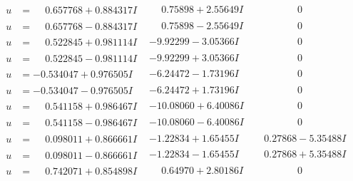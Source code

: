 \documentclass[1p]{elsarticle_modified}
\theoremstyle{definition}
\begin{document}
$$\begin{array}{c|c|c}
\begin{aligned}
u &= \phantom{-}0.657768 + 0.884317 I\end{aligned}
 & \phantom{-}0.75898 + 2.55649 I & \phantom{-0.000000 } 0 \\ \hline\begin{aligned}
u &= \phantom{-}0.657768 - 0.884317 I\end{aligned}
 & \phantom{-}0.75898 - 2.55649 I & \phantom{-0.000000 } 0 \\ \hline\begin{aligned}
u &= \phantom{-}0.522845 + 0.981114 I\end{aligned}
 & -9.92299 - 3.05366 I & \phantom{-0.000000 } 0 \\ \hline\begin{aligned}
u &= \phantom{-}0.522845 - 0.981114 I\end{aligned}
 & -9.92299 + 3.05366 I & \phantom{-0.000000 } 0 \\ \hline\begin{aligned}
u &= -0.534047 + 0.976505 I\end{aligned}
 & -6.24472 - 1.73196 I & \phantom{-0.000000 } 0 \\ \hline\begin{aligned}
u &= -0.534047 - 0.976505 I\end{aligned}
 & -6.24472 + 1.73196 I & \phantom{-0.000000 } 0 \\ \hline\begin{aligned}
u &= \phantom{-}0.541158 + 0.986467 I\end{aligned}
 & -10.08060 + 6.40086 I & \phantom{-0.000000 } 0 \\ \hline\begin{aligned}
u &= \phantom{-}0.541158 - 0.986467 I\end{aligned}
 & -10.08060 - 6.40086 I & \phantom{-0.000000 } 0 \\ \hline\begin{aligned}
u &= \phantom{-}0.098011 + 0.866661 I\end{aligned}
 & -1.22834 + 1.65455 I & \phantom{-}0.27868 - 5.35488 I \\ \hline\begin{aligned}
u &= \phantom{-}0.098011 - 0.866661 I\end{aligned}
 & -1.22834 - 1.65455 I & \phantom{-}0.27868 + 5.35488 I \\ \hline\begin{aligned}
u &= \phantom{-}0.742071 + 0.854898 I\end{aligned}
 & \phantom{-}0.64970 + 2.80186 I & \phantom{-0.000000 } 0 \\ \hline\begin{aligned}

\end{aligned}
\end{array}$$
\end{document}

